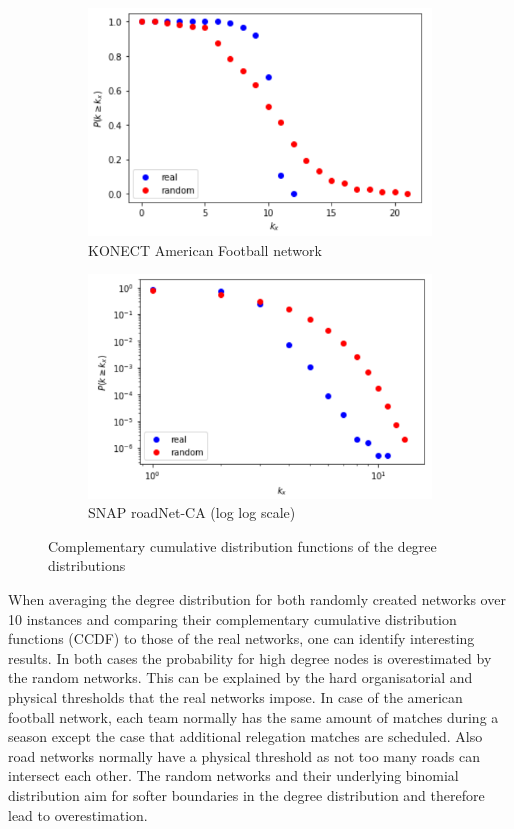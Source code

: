 \begin{figure}[h]
	\centering
	\begin{subfigure}{.5\textwidth}
		\centering
		\includegraphics[width=\linewidth]{images/american_football.png}
		\caption{KONECT American Football network}
	\end{subfigure}%
	\begin{subfigure}{.5\textwidth}
		\centering
		\includegraphics[width=\linewidth]{images/california_roads.png}
		\caption{SNAP roadNet-CA (log log scale)}
	\end{subfigure}
	\caption{Complementary cumulative distribution functions of the degree distributions}
	\label{fig:test}
\end{figure}

When averaging the degree distribution for both randomly created networks over 10 instances and comparing their complementary cumulative distribution functions (CCDF) to those of the real networks, one can identify interesting results. In both cases the probability for high degree nodes is overestimated by the random networks. This can be explained by the hard organisatorial and physical thresholds that the real networks impose. In case of the american football network, each team normally has the same amount of matches during a season except the case that additional relegation matches are scheduled. Also road networks normally have a physical threshold as not too many roads can intersect each other. The random networks and their underlying binomial distribution aim for softer boundaries in the degree distribution and therefore lead to overestimation. 

